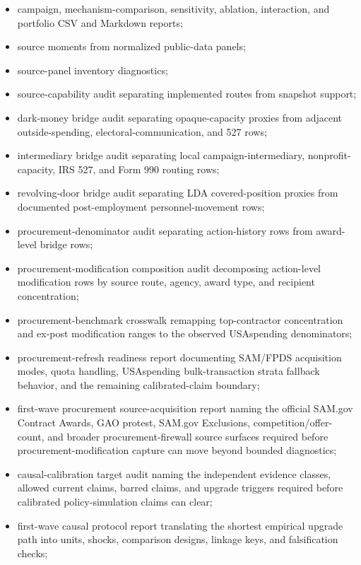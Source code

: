 \begin{itemize}
  \item campaign, mechanism-comparison, sensitivity, ablation, interaction, and portfolio CSV and Markdown reports;
  \item source moments from normalized public-data panels;
  \item source-panel inventory diagnostics;
  \item source-capability audit separating implemented routes from snapshot support;
  \item dark-money bridge audit separating opaque-capacity proxies from adjacent outside-spending, electoral-communication, and 527 rows;
  \item intermediary bridge audit separating local campaign-intermediary, nonprofit-capacity, IRS 527, and Form 990 routing rows;
  \item revolving-door bridge audit separating LDA covered-position proxies from documented post-employment personnel-movement rows;
  \item procurement-denominator audit separating action-history rows from award-level bridge rows;
  \item procurement-modification composition audit decomposing action-level modification rows by source route, agency, award type, and recipient concentration;
  \item procurement-benchmark crosswalk remapping top-contractor concentration and ex-post modification ranges to the observed USAspending denominators;
  \item procurement-refresh readiness report documenting SAM/FPDS acquisition modes, quota handling, USAspending bulk-transaction strata fallback behavior, and the remaining calibrated-claim boundary;
  \item first-wave procurement source-acquisition report naming the official SAM.gov Contract Awards, GAO protest, SAM.gov Exclusions, competition/offer-count, and broader procurement-firewall source surfaces required before procurement-modification capture can move beyond bounded diagnostics;
  \item causal-calibration target audit naming the independent evidence classes, allowed current claims, barred claims, and upgrade triggers required before calibrated policy-simulation claims can clear;
  \item first-wave causal protocol report translating the shortest empirical upgrade path into units, shocks, comparison designs, linkage keys, and falsification checks;

\end{itemize}
